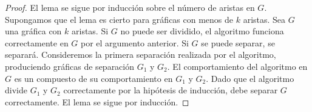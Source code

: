 \begin{proof}
El lema se sigue por inducción sobre el número de aristas en $G$. Supongamos que el lema es cierto para gráficas con menos de $k$ aristas. Sea $G$ una gráfica con $k$ aristas. Si $G$ no puede ser dividido, el algoritmo funciona correctamente en $G$ por el argumento anterior. Si $G$ se puede separar, se separará. Consideremos la primera separación realizada por el algoritmo, produciendo gráficas de separación $G_{1}$ y $G_{2}$. El comportamiento del algoritmo en $G$ es un compuesto de su comportamiento en $G_{1}$ y $G_{2}$. Dado que el algoritmo divide $G_{1}$ y $G_{2}$ correctamente por la hipótesis de inducción, debe separar $G$ correctamente. El lema se sigue por inducción.
\end{proof}

\begin{figure}[H]
    \begin{subfigure}[b]{0.3\textwidth}
        \begin{minipage}{7cm}
        \centering%
        \end{minipage}
      \end{subfigure}
      \begin{subfigure}[b]{0.3\textwidth}
        \begin{minipage}{7cm}
        \centering%
\end{minipage}
\end{subfigure}
\end{figure}
